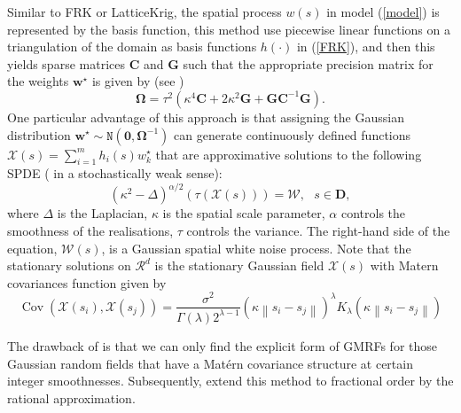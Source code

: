 \documentclass[
12pt, %
a4paper, %
oneside, %
headinclude,footinclude, %
BCOR5mm, %
]{scrartcl}
\begin{document}
Similar to FRK or LatticeKrig, the spatial process $w(s)$ in model (\ref{model}) is represented by the basis function,  this method
use piecewise linear functions on a triangulation of the domain as basis functions $h(\cdot)$ in (\ref{FRK}), and then this yields sparse matrices $\boldsymbol{C}$ and $\boldsymbol{G}$ such that the appropriate precision matrix for the weights $\boldsymbol{w}^{\star}$ is given by (see \href{https://chenyw68.github.io/Literature/[2015]Spatial and Spatio temporal Bayesian Models with R INLA.pdf}{\citep{blangiardo2015spatial}})
\begin{equation*}
\boldsymbol{\Omega} = \tau^2(\kappa^4\boldsymbol{C} + 2\kappa^2\boldsymbol{G} + \boldsymbol{G}\boldsymbol{C}^{-1}\boldsymbol{G}).
\end{equation*}
One particular advantage of this approach is that
assigning the Gaussian distribution $\boldsymbol{w}^{\star} \sim \texttt{N}(\boldsymbol{0}, \boldsymbol{\Omega}^{-1})$ can generate continuously defined functions $\mathcal{X}(s) = \sum_{i = 1}^{m}h_i(s)w_k^{\star} $ that are approximative solutions to the following SPDE ( in a stochastically weak sense):
\begin{equation*}
  (\kappa^2 - \Delta)^{\alpha/2}\left(\tau(\mathcal{X}(s))\right) = \mathcal{W}, ~~~ s \in \boldsymbol{D},
\end{equation*}
where $\Delta$ is the Laplacian, $\kappa$ is the spatial scale parameter, $\alpha$ controls the smoothness of the
realisations, $\tau$ controls the variance. The right-hand side of the equation, $\mathcal{W}(s)$, is a Gaussian spatial white noise process. Note that the stationary solutions on $\mathcal{R}^d$ is \textcolor[rgb]{0.50,0.50,0.50}{the stationary Gaussian field $\mathcal{X}(s)$ with Matern covariances function} given by
\begin{equation}
\operatorname{Cov}\left(\mathcal{X}\left(s_{i}\right), \mathcal{X}\left(s_{j}\right)\right)= \frac{\sigma^{2}}{\Gamma(\lambda) 2^{\lambda-1}}\left(\kappa\left\|s_{i}-s_{j}\right\|\right)^{\lambda} K_{\lambda}\left(\kappa\left\|s_{i}-s_{j}\right\|\right)
\end{equation}

The drawback of \href{https://chenyw68.github.io/Literature/[2011]An explicit link between GF and GMRFs the SPDE approach.pdf}{\citet{lindgren2011explicit}} is that we can only find the explicit form of GMRFs for those Gaussian random fields that have a Matérn covariance structure at certain integer smoothnesses. Subsequently, \href{https://chenyw68.github.io/Literature/https://chenyw68.github.io/Literature/[2020]The Rational SPDE Approach for Gaussian Random Fields With General Smoothness.pdf}{\cite{bolin2020rational}} extend this method to fractional order by the rational approximation.
\end{document}
